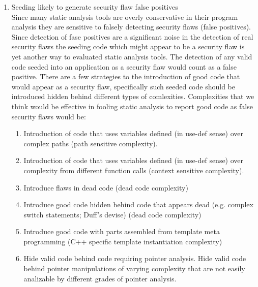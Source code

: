 \begin{enumerate}
   \item Seeding likely to generate security flaw false positives \\
         Since many static analysis tools are overly conservative in their program
         analysis they are sensitive to falsely detecting security flaws (false
         positives). Since detection of fase positives are a significant noise
         in the detection of real security flaws the seeding code which might
         appear to be a security flaw is yet another way to evaluated static 
         analysis tools.  The detection of any valid code seeded into an 
         application as a security flaw would count as a false positive.
         There are a few strategies to the introduction of good code that
         would appear as a security flaw, specifically such seeded code
         should be introduced hidden behind different types of comlexities.
         Complexities that we think would be effective in fooling static analysis
         to report good code as false security flaws would be:
         \begin{enumerate}
            \item Introduction of code that uses variables defined (in use-def sense) over
            complex paths (path sensitive complexity).
            \item Introduction of code that uses variables defined (in use-def sense) over
            complexity from different function calls (context sensitive complexity).
            \item Introduce flaws in dead code (dead code complexity)
            \item Introduce good code hidden behind code that appears dead (e.g. complex switch
            statements; Duff's devise) (dead code complexity)
            \item Introduce good code with parts assembled from template meta programming (C++
            specific template instantiation complexity)
            \item Hide valid code behind code requiring pointer analysis. 
            Hide valid code behind pointer manipulations of varying complexity that are
            not easily analizable by different grades of pointer analysis.
         \end{enumerate}

\end{enumerate}



